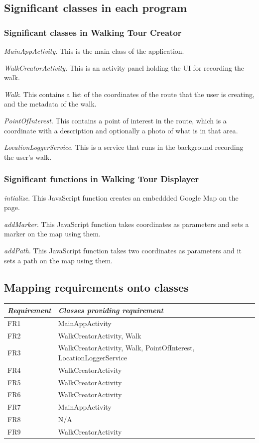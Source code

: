 \documentclass{project}
\begin{document}
\newpage

\subsection{Significant classes in each program}
\subsubsection{Significant classes in Walking Tour Creator}
\emph{MainAppActivity}. This is the main class of the application.

\emph{WalkCreatorActivity}. This is an activity panel holding the UI for
recording the walk.

\emph{Walk}. This contains a list of the coordinates of the route that the user
is creating, and the metadata of the walk.

\emph{PointOfInterest}. This contains a point of interest in the route, which
is a coordinate with a description and optionally a photo of what is in that
area.

\emph{LocationLoggerService}. This is a service that runs in the background
recording the user's walk.


\subsubsection{Significant functions in Walking Tour Displayer}
\emph{intialize}. This JavaScript function creates an embeddded Google Map on
the page.

\emph{addMarker}. This JavaScript function takes coordinates as parameters and
sets a marker on the map using them.

\emph{addPath}. This JavaScript function takes two coordinates as parameters
and it sets a path on the map using them.


\subsection{Mapping requirements onto classes}
\begin{tabular}{|l |l |}
\hline
\emph{Requirement} & \emph{Classes providing requirement} \\
\hline
FR1 & MainAppActivity \\
\hline
FR2 & WalkCreatorActivity, Walk \\
\hline
FR3 & WalkCreatorActivity, Walk, PointOfInterest, LocationLoggerService \\
\hline
FR4 & WalkCreatorActivity \\
\hline
FR5 & WalkCreatorActivity \\
\hline
FR6 & WalkCreatorActivity \\
\hline
FR7 & MainAppActivity \\
\hline
FR8 & N/A \\
\hline
FR9 & WalkCreatorActivity \\
\hline
\end{tabular}
\end{document}
